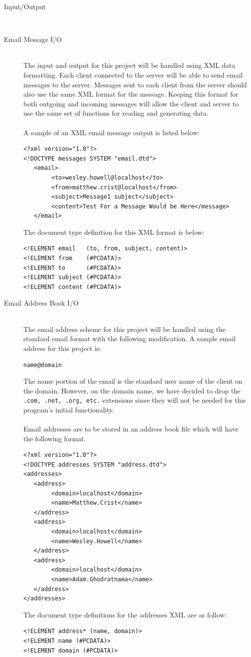 \documentclass[11pt, letterpaper]{report}
\begin{document}
\begin{description}
\newpage
\hypertarget{IO}{}
\item[\Large Input/Output] \hfill \\ 
\item[Email Message I/O] \hfill \\
The input and output for this project will be handled using XML data formatting. Each client connected
 to the server will be able to send email messages to the server. Messages sent to each client from
  the server should also use the same XML format for the message. Keeping this format for both
   outgoing and incoming messages will allow the client and server to use the same set of functions
    for reading and generating data. \\ \\
A sample of an XML email message output is listed below:
\begin{verbatim}
<?xml version="1.0"?>
<!DOCTYPE messages SYSTEM "email.dtd">
   <email>
        <to>wesley.howell@localhost</to>
        <from>matthew.crist@localhost</from>
        <subject>Message1 subject</subject>
        <content>Test For a Message Would be Here</message>
   </email>
\end{verbatim} 
The document type definition for this XML format is below:
\begin{verbatim}
<!ELEMENT email   (to, from, subject, content)>
<!ELEMENT from    (#PCDATA)>
<!ELEMENT to      (#PCDATA)>
<!ELEMENT subject (#PCDATA)>
<!ELEMENT content (#PCDATA)>

\end{verbatim}


\item[Email Address Book I/O] \hfill \\
The email address scheme for this project will be handled using the standard email format with the following modification. A sample email address for this project is:
\begin{center}\verb$name@domain$ \end{center}
The name portion of the email is the standard user name of the client on the domain. However, on the domain name, we have decided to drop the \verb$.com, .net, .org, etc.$ extensions since they will not be needed for this program's initial functionality. \\ \\
Email addresses are to be stored in an address book file which will have the following format.
\begin{verbatim}
<?xml version="1.0"?>
<!DOCTYPE addresses SYSTEM "address.dtd">
<addresses>
   <address>
        <domain>localhost</domain>
        <name>Matthew.Crist</name>
   </address>
   <address>
        <domain>localhost</domain>
        <name>Wesley.Howell</name>
   </address>
   <address>
        <domain>localhost</domain>
        <name>Adam.Ghodratnama</name>
   </address>
</addresses>
\end{verbatim}
The document type definitions for the addresses XML are as follow:
\begin{verbatim}
<!ELEMENT address* (name, domain)>
<!ELEMENT name (#PCDATA)>
<!ELEMENT domain (#PCDATA)>
\end{verbatim}


\end{description}
\end{document}
